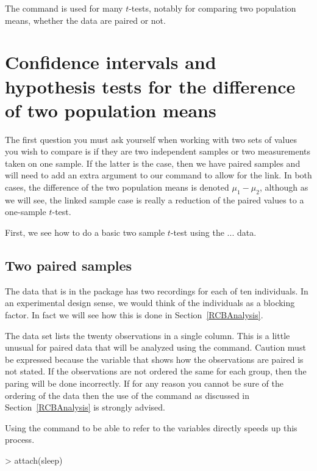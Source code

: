 The  command is used for many $t$-tests, notably for comparing two population means, whether the data are paired or not.

\section{Confidence intervals and hypothesis tests for the difference of two population means}

The first question you must ask yourself when working with two sets of values you wish to compare is if they are two independent samples or two measurements taken on one sample. If the latter is the case, then we have paired samples and will need to add an extra argument to our command to allow for the link. In both cases, the difference of the two population means is denoted $\mu_1-\mu_2$, although as we will see, the linked sample case is really a reduction of the paired values to a one-sample $t$-test. 

First, we see how to do a basic two sample $t$-test using the ... data.

\subsection{Two paired samples}
\label{PairedSamplesTTest}

The  data that is in the  package has two recordings for each of ten individuals. In an experimental design sense, we would think of the individuals as a blocking factor. In fact we will see how this is done in Section~\ref{RCBAnalysis}.

The data set lists the twenty observations in a single column. This is a little unusual for paired data that will be analyzed using the  command. Caution must be expressed because the variable that shows how the observations are paired is not stated. If the observations are not ordered the same for each group, then the paring will be done incorrectly. If for any reason you cannot be sure of the ordering of the data then the use of the  command as discussed in Section~\ref{RCBAnalysis} is strongly advised.

Using the  command to be able to refer to the variables directly speeds up this process.
\begin{Schunk}
\begin{Sinput}
> attach(sleep)
\end{Sinput}
\end{Schunk}

